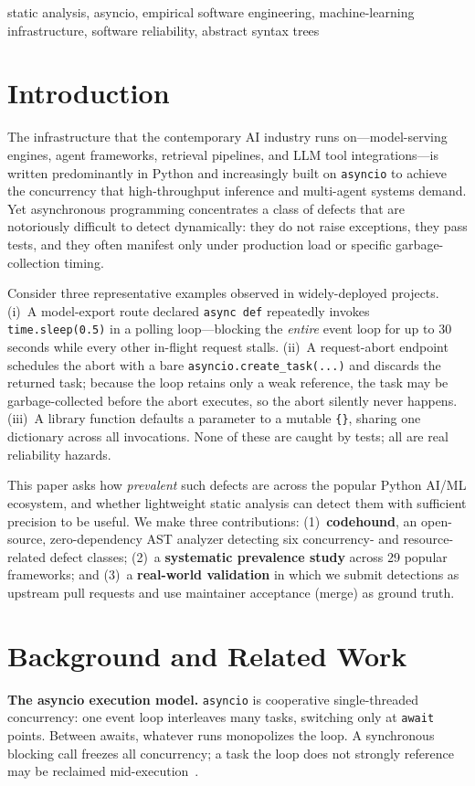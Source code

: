 \documentclass[conference]{IEEEtran}
\begin{document}
\begin{IEEEkeywords}
static analysis, asyncio, empirical software engineering, machine-learning infrastructure, software reliability, abstract syntax trees
\end{IEEEkeywords}

\section{Introduction}
The infrastructure that the contemporary AI industry runs on---model-serving engines, agent frameworks, retrieval pipelines, and LLM tool integrations---is written predominantly in Python and increasingly built on \texttt{asyncio} to achieve the concurrency that high-throughput inference and multi-agent systems demand. Yet asynchronous programming concentrates a class of defects that are notoriously difficult to detect dynamically: they do not raise exceptions, they pass tests, and they often manifest only under production load or specific garbage-collection timing.

Consider three representative examples observed in widely-deployed projects. (i)~A model-export route declared \texttt{async def} repeatedly invokes \texttt{time.sleep(0.5)} in a polling loop---blocking the \emph{entire} event loop for up to 30 seconds while every other in-flight request stalls. (ii)~A request-abort endpoint schedules the abort with a bare \texttt{asyncio.create\_task(...)} and discards the returned task; because the loop retains only a weak reference, the task may be garbage-collected before the abort executes, so the abort silently never happens. (iii)~A library function defaults a parameter to a mutable \texttt{\{\}}, sharing one dictionary across all invocations. None of these are caught by tests; all are real reliability hazards.

This paper asks how \emph{prevalent} such defects are across the popular Python AI/ML ecosystem, and whether lightweight static analysis can detect them with sufficient precision to be useful. We make three contributions: (1)~\textbf{codehound}, an open-source, zero-dependency AST analyzer detecting six concurrency- and resource-related defect classes; (2)~a \textbf{systematic prevalence study} across 29 popular frameworks; and (3)~a \textbf{real-world validation} in which we submit detections as upstream pull requests and use maintainer acceptance (merge) as ground truth.

\section{Background and Related Work}
\textbf{The asyncio execution model.} \texttt{asyncio} is cooperative single-threaded concurrency: one event loop interleaves many tasks, switching only at \texttt{await} points. Between awaits, whatever runs monopolizes the loop. A synchronous blocking call freezes all concurrency; a task the loop does not strongly reference may be reclaimed mid-execution~\cite{pyasyncio}.
\end{document}
